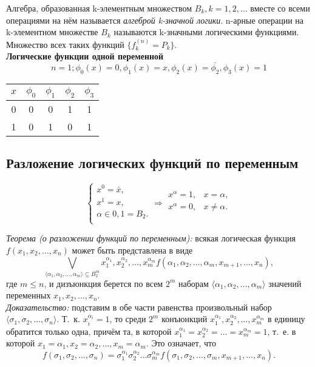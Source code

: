 \documentclass[a4paper,12pt]{report}
\begin{document}
	Алгебра, образованная k-элементным множеством $ B_k, k = 1, 2, \dots $ вместе
	со всеми операциями на нём называется \textit{алгеброй k-значной логики}.
	n-арные операции на k-элементном множестве $ B_k $ называются k-значными
	логическими функциями. Множество всех таких функций $ \{f^{(n)}_k = P_k \} $.
	\\

	\textbf{Логические функции одной переменной}
	$$ n = 1; \phi_0(x) = 0, \phi_1(x) = x, \phi_2(x) = \bar{\phi_2},
	\phi_3(x) = 1 $$

	\begin{center}
		\begin{tabular}{ | c || c | c | c | c | }
			\hline
			$x$ & $\phi_0$ & $\phi_1$ & $\phi_2$ & $\phi_3$ \\
			\hline
			\hline
			0 & 0 & 0 & 1 & 1 \\
			\hline
			1 & 0 & 1 & 0 & 1 \\
			\hline
		\end{tabular}
	\end{center}

\subsection{Разложение логических функций по переменным}
	$$
	\begin{cases}
		x^0 = \bar{x}, \\
		x^1 = x, \\
		\alpha \in 0, 1 = B_2. \\
	\end{cases}
	\Rightarrow
	\begin{aligned}
		x^{\alpha} = 1, & x = \alpha,\\
		x^{\alpha} = 0, & x \neq \alpha.\\
	\end{aligned}
	$$

	\textit{Теорема (о разложении функций по переменным):} всякая логическая
	функция $ f(x_1, x_2, \dots, x_n) $ может быть представлена в виде
	$$ \bigvee_{\langle \alpha_1, \alpha_2, \dots, \alpha_m \rangle \subseteq
	B^m_2}
	x^{\alpha_1}_1, x^{\alpha_2}_2, \dots, x^{\alpha_m}_m
	f(\alpha_1, \alpha_2, \dots, \alpha_m, x_{m+1}, \dots, x_n),$$
	где $ m \leq n $, и дизъюнкция берется по всем $ 2^m $ наборам $ \langle
	\alpha_1, \alpha_2, \dots, \alpha_m \rangle $ значений переменных $ x_1, x_2,
	\dots, x_n $.\\

	\textit{Доказательство:} подставим в обе части равенства произвольный набор
	$ \langle \sigma_1, \sigma_2, \dots, \sigma_n \rangle $. Т.~к.
	$ x^{\alpha_i}_i = 1 $, то среди $ 2^m $ конъюнкций $ x^{\alpha_1}_1,
	x^{\alpha_2}_2, \dots, x^{\alpha_m}_m $ в единицу обратится только одна,
	причём та, в которой $ x^{\alpha_1}_1 = x^{\alpha_2}_2 = \dots =
	x^{\alpha_m}_m = 1 $, т.~е. в которой $ x_1 = \alpha_1, x_2 = \alpha_2,
	\dots, x_m = \alpha_m $. Это означает, что
	$$ f(\sigma_1, \sigma_2, \dots, \sigma_n) =
	\sigma_1^{\alpha_1} \sigma_2^{\alpha_2} \dots \sigma_m^{\alpha_m}
	f(\sigma_1, \sigma_2, \dots, \sigma_m, x_{m+1}, \dots, x_n). $$
\end{document}
